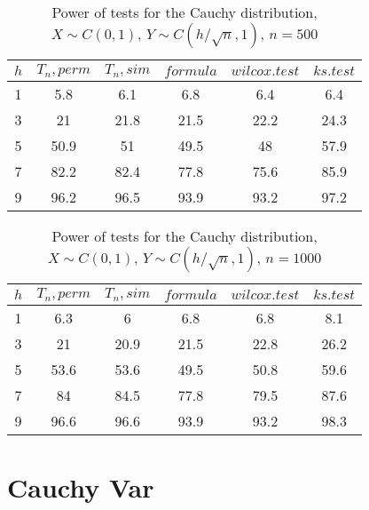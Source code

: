 \documentclass{svproc}
\begin{document}
\begin{table}
  \caption{Power of tests for the Cauchy distribution, $X\sim C(0,1)$, $Y\sim C(h/\sqrt{n},1)$, $n=500$}
  \begin{center}
  \begin{tabular}{c@{\quad}c@{\quad}c@{\quad}c@{\quad}c@{\quad}c}
  \hline
  $h$ & $T_n, perm$ & $T_n, sim$ & $formula$ & $wilcox.test$ & $ks.test$ \\
  \hline
  1 & 5.8   & 6.1      & 6.8       & 6.4           & 6.4       \\
  3 & 21    & 21.8     & 21.5      & 22.2          & 24.3      \\
  5 & 50.9  & 51       & 49.5      & 48            & 57.9      \\
  7 & 82.2  & 82.4     & 77.8      & 75.6          & 85.9      \\
  9 & 96.2  & 96.5     & 93.9      & 93.2          & 97.2      \\
  \hline
  \end{tabular}
  \end{center}
\end{table}

\begin{table}
  \caption{Power of tests for the Cauchy distribution, $X\sim C(0,1)$, $Y\sim C(h/\sqrt{n},1)$, $n=1000$}
  \begin{center}
  \begin{tabular}{c@{\quad}c@{\quad}c@{\quad}c@{\quad}c@{\quad}c}
  \hline
  $h$  & $T_n, perm$ & $T_n, sim$ & $formula$ & $wilcox.test$ & $ks.test$ \\
  \hline
  1 & 6.3 & 6 & 6.8 & 6.8 & 8.1 \\
  3 & 21 & 20.9 & 21.5 & 22.8 & 26.2 \\
  5 & 53.6 & 53.6 & 49.5 & 50.8 & 59.6 \\
  7 & 84 & 84.5 & 77.8 & 79.5 & 87.6 \\
  9 & 96.6 & 96.6 & 93.9 & 93.2 & 98.3 \\
  \hline
  \end{tabular}
  \end{center}
\end{table}

\newpage

\section*{Cauchy Var}
\end{document}
